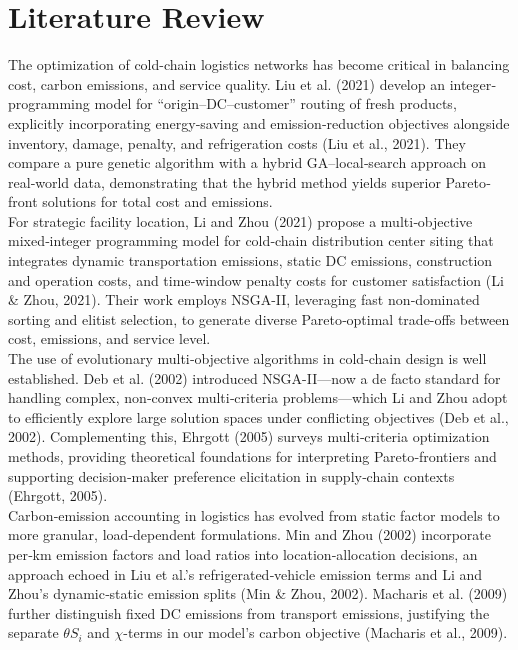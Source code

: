 \documentclass[conference]{IEEEtran}
\begin{document}
\bigskip

\section{Literature Review}

The optimization of cold-chain logistics networks has become critical in balancing cost, carbon emissions, and service quality. Liu et al. (2021) develop an integer‐programming model for “origin–DC–customer” routing of fresh products, explicitly incorporating energy‐saving and emission‐reduction objectives alongside inventory, damage, penalty, and refrigeration costs \cite{Liu2021} (Liu et al., 2021). They compare a pure genetic algorithm with a hybrid GA–local‐search approach on real‐world data, demonstrating that the hybrid method yields superior Pareto‐front solutions for total cost and emissions.\\
For strategic facility location, Li and Zhou (2021) propose a multi‐objective mixed‐integer programming model for cold‐chain distribution center siting that integrates dynamic transportation emissions, static DC emissions, construction and operation costs, and time‐window penalty costs for customer satisfaction \cite{Li2021} (Li & Zhou, 2021). Their work employs NSGA-II, leveraging fast non‐dominated sorting and elitist selection, to generate diverse Pareto‐optimal trade-offs between cost, emissions, and service level.\\
The use of evolutionary multi‐objective algorithms in cold‐chain design is well established. Deb et al. (2002) introduced NSGA-II—now a de facto standard for handling complex, non‐convex multi‐criteria problems—which Li and Zhou adopt to efficiently explore large solution spaces under conflicting objectives \cite{Deb2002} (Deb et al., 2002). Complementing this, Ehrgott (2005) surveys multi‐criteria optimization methods, providing theoretical foundations for interpreting Pareto‐frontiers and supporting decision‐maker preference elicitation in supply‐chain contexts \cite{Ehrgott2005} (Ehrgott, 2005).\\
Carbon‐emission accounting in logistics has evolved from static factor models to more granular, load‐dependent formulations. Min and Zhou (2002) incorporate per‐km emission factors and load ratios into location‐allocation decisions, an approach echoed in Liu et al.'s refrigerated‐vehicle emission terms and Li and Zhou’s dynamic‐static emission splits \cite{Min2002} (Min & Zhou, 2002). Macharis et al. (2009) further distinguish fixed DC emissions from transport emissions, justifying the separate $\theta S_i$ and $\chi$-terms in our model’s carbon objective \cite{Macharis2009} (Macharis et al., 2009).\\
\end{document}
